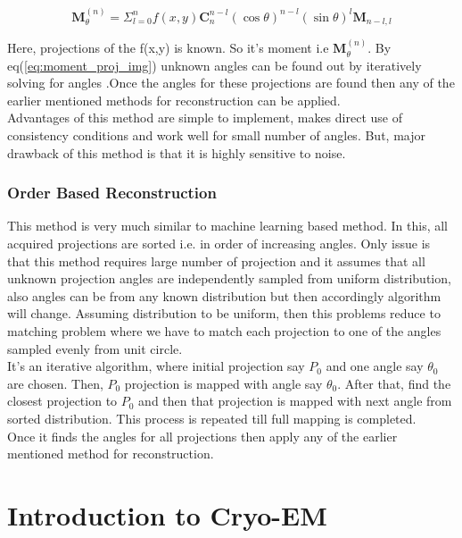 \documentclass[twoside]{iitbreport}
\begin{document}
\begin{equation}\label{eq:moment_proj_img}
\boldsymbol{M}_{\theta}^{(n)} =  \Sigma_{l=0}^n f(x,y) \boldsymbol{C}_n^{n-l} (\cos\theta)^{n-l} (\sin\theta)^l \boldsymbol{M}_{n-l,l}
\end{equation}

\noindent
Here, projections of the f(x,y) is known. So it's moment i.e $\boldsymbol{M}_{\theta}^{(n)}$. By eq(\ref{eq:moment_proj_img}) unknown angles can be found out by iteratively solving for angles \cite{malhotra2016tomographic}.Once the angles for these projections are found then any of the earlier mentioned methods for reconstruction can be applied. \\

\noindent
Advantages of this method are simple to implement, makes direct use of consistency conditions and work well for small number of angles. But, major drawback of this method is that it is highly sensitive to noise.

\subsection{Order Based Reconstruction}\label{subsec:recont_order-based}
This method is very much similar to machine learning based method. In this, all acquired projections are sorted i.e. in order of increasing angles. Only issue is that this method requires large number of projection and it assumes that all unknown projection angles are independently sampled from uniform distribution, also angles can be from any known distribution but then accordingly algorithm will change. Assuming distribution to be uniform, then this problems reduce to matching problem where we have to match each projection to one of the angles sampled evenly from unit circle.\\

\noindent
It's an iterative algorithm, where initial projection say $P_0$ and one angle say $\theta_0$ are chosen. Then, $P_0$ projection is mapped with angle say $\theta_0$. After that, find the closest projection to $P_0$ and then that projection is mapped with next angle from sorted distribution. This process is repeated till full mapping is completed. \\

\noindent
Once it finds the angles for all projections then apply any of the earlier mentioned method for reconstruction. 

\chapter{Introduction to Cryo-EM}
\end{document}
